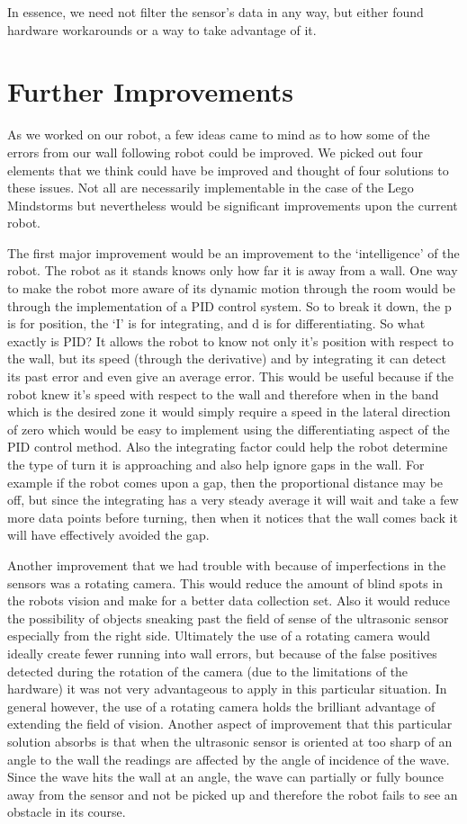 \documentclass[letterpaper,12pt]{article}
\begin{document}
{In essence, we need not filter the sensor’s data in any way, but either found hardware workarounds or a way to take advantage of it.}

\section{Further Improvements}{As we worked on our robot, a few ideas came to mind as to how some of the errors from our wall following robot could be improved. We picked out four elements that we think could have be improved and thought of four solutions to these issues. Not all are necessarily implementable in the case of the Lego Mindstorms but nevertheless would be significant improvements upon the current robot.

The first major improvement would be an improvement to the ‘intelligence’ of the robot. The robot as it stands knows only how far it is away from a wall. One way to make the robot more aware of its dynamic motion through the room would be through the implementation of a PID control system. So to break it down, the p is for position, the ‘I’ is for integrating, and d is for differentiating. So what exactly is PID? It allows the robot to know not only it’s position with respect to the wall, but its speed (through the derivative) and by integrating it can detect its past error and even give an average error. This would be useful because if the robot knew it’s speed with respect to the wall and therefore when in the band which is the desired zone it would simply require a speed in the lateral direction of zero which would be easy to implement using the differentiating aspect of the PID control method. Also the integrating factor could help the robot determine the type of turn it is approaching and also help ignore gaps in the wall. For example if the robot comes upon a gap, then the proportional distance may be off, but since the integrating has a very steady average it will wait and take a few more data points before turning, then when it notices that the wall comes back it will have effectively avoided the gap.

Another improvement that we had trouble with because of imperfections in the sensors was a rotating camera. This would reduce the amount of blind spots in the robots vision and make for a better data collection set. Also it would reduce the possibility of objects sneaking past the field of sense of the ultrasonic sensor especially from the right side. Ultimately the use of a rotating camera would ideally create fewer running into wall errors, but because of the false positives detected during the rotation of the camera (due to the limitations of the hardware) it was not very advantageous to apply in this particular situation. In general however, the use of a rotating camera holds the brilliant advantage of extending the field of vision. Another aspect of improvement that this particular solution absorbs is that when the ultrasonic sensor is oriented at too sharp of an angle to the wall the readings are affected by the angle of incidence of the wave. Since the wave hits the wall at an angle, the wave can partially or fully bounce away from the sensor and not be picked up and therefore the robot fails to see an obstacle in its course.

}
\end{document}
